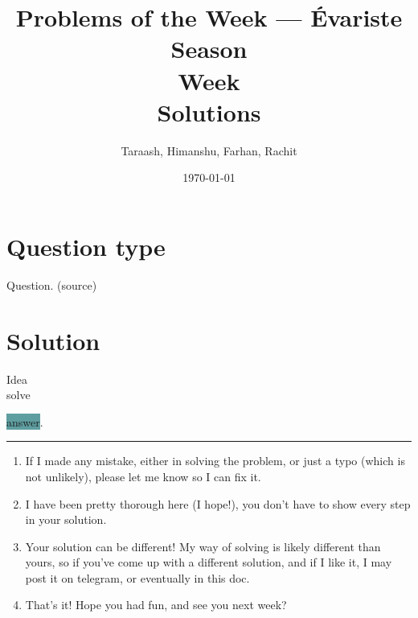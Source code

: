 \documentclass[12pt, letterpaper]{article}
\title{\vspace{-2cm}Problems of the Week --- Évariste \\ Season \season \\ Week \week \\ Solutions}
\author{Taraash, Himanshu, Farhan, Rachit}
\date{\today}
\begin{document}
\maketitle

\section{Question type}
Question. {\color{gray}(source)}

\section*{Solution}
\colorbox{Dandelion}{Idea}\\
solve

\colorbox{CadetBlue}{answer}.


\newpage

{\color{RubineRed} \rule{\linewidth}{0.5mm}}
\vspace{20pt}
\begin{enumerate} 
\item  If I made any mistake, either in solving the problem, or just a typo (which is not unlikely), please let me know so I can fix it.
\item I have been pretty thorough here (I hope!), you don't have to show every step in your solution.
\item Your solution can be different! My way of solving is likely different than yours, so if you've come up with a different solution, and if I like it, I may post it on telegram, or eventually in this doc.
\item That's it! Hope you had fun, and see you next week?
\end{enumerate}

\vspace{50pt}
\begin{center}
\end{center}
\end{document}

